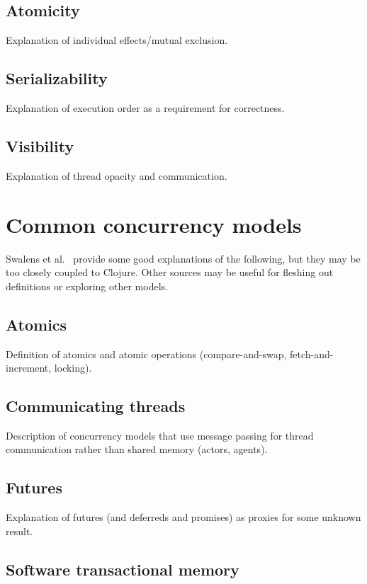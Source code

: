 \documentclass{sig-alternate}
\begin{document}
\subsection{Atomicity}

Explanation of individual effects/mutual exclusion.

\subsection{Serializability}

Explanation of execution order as a requirement for correctness.

\subsection{Visibility}

Explanation of thread opacity and communication.

\section{Common concurrency models}

Swalens et al.~\cite{Swalens2014} provide some good explanations of the following, but they may be too closely coupled to Clojure. Other sources may be useful for fleshing out definitions or exploring other models.

\subsection{Atomics}

Definition of atomics and atomic operations (compare-and-swap, fetch-and-increment, locking).

\subsection{Communicating threads}

Description of concurrency models that use message passing for thread communication rather than shared memory (actors, agents).

\subsection{Futures}

Explanation of futures (and deferreds and promises) as proxies for some unknown result.

\subsection{Software transactional memory}
\end{document}
